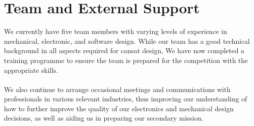\documentclass{report}
\begin{document}
	\section{Team and External Support}
		We currently have five team members with varying levels of experience in
		mechanical, electronic, and software design. While our team has a good
		technical background in all aspects required for cansat design, {\color{blue}
		We have now completed a training programme to ensure the team is 
		prepared for the competition with the appropriate skills.}
		\\\\
		We also continue to arrange occasional meetings and communications with
		professionals in various relevant industries, thus improving our 
		understanding of how to further improve the quality of our electronics 
		and mechanical design decisions, as well as aiding us in preparing our
		secondary mission.
	\clearpage
\end{document}
